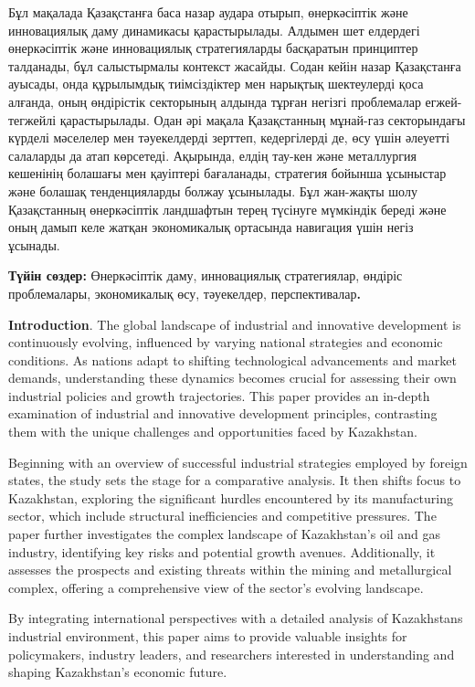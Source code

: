 Бұл мақалада Қазақстанға баса назар аудара отырып, өнеркәсіптік және
инновациялық даму динамикасы қарастырылады. Алдымен шет елдердегі
өнеркәсіптік және инновациялық стратегияларды басқаратын принциптер
талданады, бұл салыстырмалы контекст жасайды. Содан кейін назар
Қазақстанға ауысады, онда құрылымдық тиімсіздіктер мен нарықтық
шектеулерді қоса алғанда, оның өндірістік секторының алдында тұрған
негізгі проблемалар егжей-тегжейлі қарастырылады. Одан әрі мақала
Қазақстанның мұнай-газ секторындағы күрделі мәселелер мен тәуекелдерді
зерттеп, кедергілерді де, өсу үшін әлеуетті салаларды да атап көрсетеді.
Ақырында, елдің тау-кен және металлургия кешенінің болашағы мен
қауіптері бағаланады, стратегия бойынша ұсыныстар және болашақ
тенденцияларды болжау ұсынылады. Бұл жан-жақты шолу Қазақстанның
өнеркәсіптік ландшафтын терең түсінуге мүмкіндік береді және оның дамып
келе жатқан экономикалық ортасында навигация үшін негіз ұсынады.

{\bfseries Түйін сөздер:} Өнеркәсіптік даму, инновациялық стратегиялар,
өндіріс проблемалары, экономикалық өсу, тәуекелдер,
перспективалар{\bfseries .}

{\bfseries Introduction}. The global landscape of industrial and innovative
development is continuously evolving, influenced by varying national
strategies and economic conditions. As nations adapt to shifting
technological advancements and market demands, understanding these
dynamics becomes crucial for assessing their own industrial policies and
growth trajectories. This paper provides an in-depth examination of
industrial and innovative development principles, contrasting them with
the unique challenges and opportunities faced by Kazakhstan.

Beginning with an overview of successful industrial strategies employed
by foreign states, the study sets the stage for a comparative analysis.
It then shifts focus to Kazakhstan, exploring the significant hurdles
encountered by its manufacturing sector, which include structural
inefficiencies and competitive pressures. The paper further investigates
the complex landscape of Kazakhstan's oil and gas industry, identifying
key risks and potential growth avenues. Additionally, it assesses the
prospects and existing threats within the mining and metallurgical
complex, offering a comprehensive view of the sector's evolving
landscape.

By integrating international perspectives with a detailed analysis of
Kazakhstan\textquotesingle s industrial environment, this paper aims to
provide valuable insights for policymakers, industry leaders, and
researchers interested in understanding and shaping Kazakhstan's
economic future.

